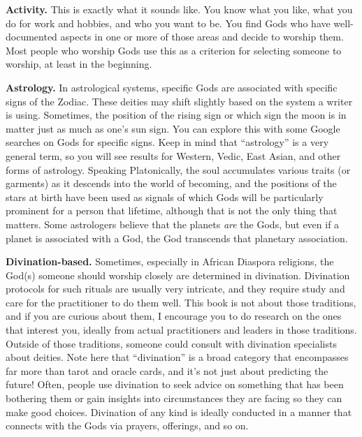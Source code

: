 \documentclass[
]{book}
\begin{document}
\textbf{Activity.} This is exactly what it sounds like. You know what you like, what you do for work and hobbies, and who you want to be. You find Gods who have well-documented aspects in one or more of those areas and decide to worship them. Most people who worship Gods use this as a criterion for selecting someone to worship, at least in the beginning.

\textbf{Astrology.} In astrological systems, specific Gods are associated with specific signs of the Zodiac. These deities may shift slightly based on the system a writer is using. Sometimes, the position of the rising sign or which sign the moon is in matter just as much as one's sun sign. You can explore this with some Google searches on Gods for specific signs. Keep in mind that ``astrology'' is a very general term, so you will see results for Western, Vedic, East Asian, and other forms of astrology. Speaking Platonically, the soul accumulates various traits (or garments) as it descends into the world of becoming, and the positions of the stars at birth have been used as signals of which Gods will be particularly prominent for a person that lifetime, although that is not the only thing that matters. Some astrologers believe that the planets \emph{are} the Gods, but even if a planet is associated with a God, the God transcends that planetary association.

\textbf{Divination-based.} Sometimes, especially in African Diaspora religions, the God(s) someone should worship closely are determined in divination. Divination protocols for such rituals are usually very intricate, and they require study and care for the practitioner to do them well. This book is not about those traditions, and if you are curious about them, I encourage you to do research on the ones that interest you, ideally from actual practitioners and leaders in those traditions. Outside of those traditions, someone could consult with divination specialists about deities. Note here that ``divination'' is a broad category that encompasses far more than tarot and oracle cards, and it's not just about predicting the future! Often, people use divination to seek advice on something that has been bothering them or gain insights into circumstances they are facing so they can make good choices. Divination of any kind is ideally conducted in a manner that connects with the Gods via prayers, offerings, and so on.
\end{document}
